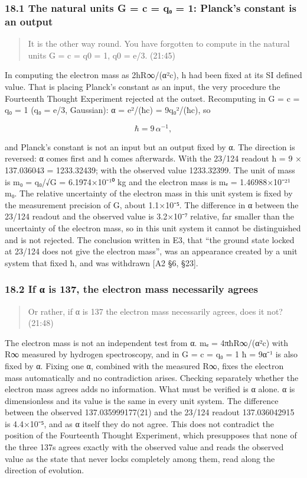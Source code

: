 \documentclass[
  a4paper,
]{article}
\newcounter{none} %
\begin{document}
\subsubsection{18.1 The natural units G = c = q₀ = 1: Planck's constant
is an
output}\label{the-natural-units-g-c-qux2080-1-plancks-constant-is-an-output}

\begin{quote}
It is the other way round. You have forgotten to compute in the natural
units G = c = q0 = 1, q0 = e/3. (21:45)
\end{quote}

In computing the electron mass as 2hR∞/(α²c), h had been fixed at its SI
defined value. That is placing Planck's constant as an input, the very
procedure the Fourteenth Thought Experiment rejected at the outset.
Recomputing in G = c = q₀ = 1 (q₀ = e/3, Gaussian): α = e²/(ħc) =
9q₀²/(ħc), so

\[
\hbar=9\,\alpha^{-1},
\]

and Planck's constant is not an input but an output fixed by α. The
direction is reversed: α comes first and ħ comes afterwards. With the
23/124 readout ħ = 9 × 137.036043 = 1233.32439; with the observed value
1233.32399. The unit of mass is m₀ = q₀/√G = 6.1974×10⁻¹⁰ kg and the
electron mass is mₑ = 1.46988×10⁻²¹ m₀. The relative uncertainty of the
electron mass in this unit system is fixed by the measurement precision
of G, about 1.1×10⁻⁵. The difference in α between the 23/124 readout and
the observed value is 3.2×10⁻⁷ relative, far smaller than the
uncertainty of the electron mass, so in this unit system it cannot be
distinguished and is not rejected. The conclusion written in E3, that
``the ground state locked at 23/124 does not give the electron mass'',
was an appearance created by a unit system that fixed ħ, and was
withdrawn {[}A2 §6, §23{]}.

\subsubsection{18.2 If α is 137, the electron mass necessarily
agrees}\label{if-ux3b1-is-137-the-electron-mass-necessarily-agrees}

\begin{quote}
Or rather, if α is 137 the electron mass necessarily agrees, does it
not? (21:48)
\end{quote}

The electron mass is not an independent test from α. mₑ = 4πħR∞/(α²c)
with R∞ measured by hydrogen spectroscopy, and in G = c = q₀ = 1 ħ =
9α⁻¹ is also fixed by α. Fixing one α, combined with the measured R∞,
fixes the electron mass automatically and no contradiction arises.
Checking separately whether the electron mass agrees adds no
information. What must be verified is α alone. α is dimensionless and
its value is the same in every unit system. The difference between the
observed 137.035999177(21) and the 23/124 readout 137.036042915 is
4.4×10⁻⁵, and as α itself they do not agree. This does not contradict
the position of the Fourteenth Thought Experiment, which presupposes
that none of the three 137s agrees exactly with the observed value and
reads the observed value as the state that never locks completely among
them, read along the direction of evolution.
\end{document}
